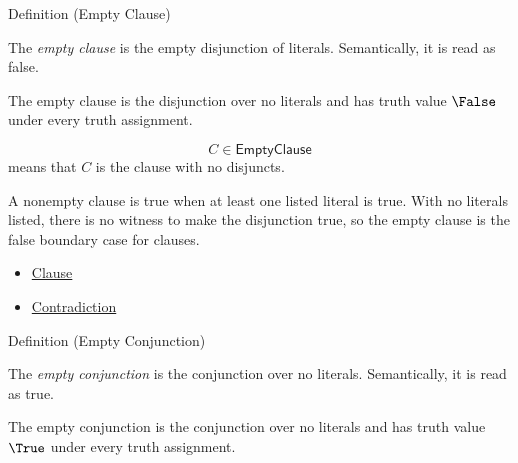 \begin{definitionbox}{Definition (Empty Clause)}
\begin{definition}
\label{def:empty-clause-propositional-logic}
The \emph{empty clause} is the empty disjunction of literals. Semantically, it
is read as false.
\end{definition}
\end{definitionbox}

\begin{remark*}
The empty clause is the disjunction over no literals and has truth value
\(\False\) under every truth assignment.
\end{remark*}

\begin{remark*}
\[
C\in\mathsf{EmptyClause}
\]
means that \(C\) is the clause with no disjuncts.
\end{remark*}

\begin{remark*}[Interpretation]
A nonempty clause is true when at least one listed literal is true. With no
literals listed, there is no witness to make the disjunction true, so the empty
clause is the false boundary case for clauses.
\end{remark*}

\begin{dependencies}
\begin{itemize}
  \item \hyperref[def:clause-propositional-logic]{Clause}
  \item \hyperref[def:contradiction-propositional-logic]{Contradiction}
\end{itemize}
\end{dependencies}

\begin{definitionbox}{Definition (Empty Conjunction)}
\begin{definition}
\label{def:empty-conjunction-propositional-logic}
The \emph{empty conjunction} is the conjunction over no literals. Semantically,
it is read as true.
\end{definition}
\end{definitionbox}

\begin{remark*}
The empty conjunction is the conjunction over no literals and has truth value
\(\True\) under every truth assignment.
\end{remark*}

